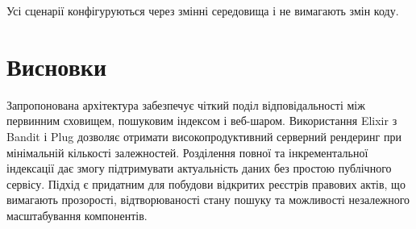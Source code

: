 \documentclass[12pt,a4paper]{article}
\begin{document}
Усі сценарії конфігуруються через змінні середовища і не вимагають змін коду.

\section{Висновки}

Запропонована архітектура забезпечує чіткий поділ відповідальності між первинним сховищем, пошуковим індексом і веб-шаром. Використання Elixir з Bandit і Plug дозволяє отримати високопродуктивний серверний рендеринг при мінімальній кількості залежностей. Розділення повної та інкрементальної індексації дає змогу підтримувати актуальність даних без простою публічного сервісу. Підхід є придатним для побудови відкритих реєстрів правових актів, що вимагають прозорості, відтворюваності стану пошуку та можливості незалежного масштабування компонентів.
\end{document}
